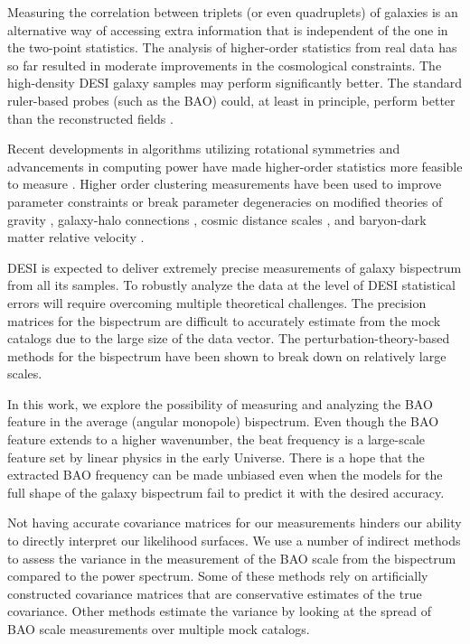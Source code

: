 Measuring the correlation between triplets (or even quadruplets) of galaxies is an alternative way of accessing extra information that is independent of the one in the two-point statistics. The analysis of higher-order statistics from real data has so far resulted in moderate improvements in the cosmological constraints. The high-density DESI galaxy samples may perform significantly better. The standard ruler-based probes (such as the BAO) could, at least in principle, perform better than the reconstructed fields \cite{samushia2021information}.

Recent developments in algorithms utilizing rotational symmetries and advancements in computing power have made higher-order statistics more feasible to measure \citep[see, e.g.,][]{Szapudi_2004,2015MNRAS.454.4142S,2016MNRAS.455L..31S, 2017MNRAS.468.1070S, 2017MNRAS.469.2059S, 2018MNRAS.478.1468S, 2022PNAS..11911366P}. Higher order clustering measurements have been used to improve parameter constraints or break parameter degeneracies on modified theories of gravity \citep{2023arXiv230206808S}, galaxy-halo connections \citep{2022MNRAS.515.6133Z}, cosmic distance scales \citep{2017MNRAS.469.1738S, 2018MNRAS.478.4500P}, and baryon-dark matter relative velocity \citep{2018MNRAS.474.2109S}.

DESI is expected to deliver extremely precise measurements of galaxy bispectrum from all its samples. To robustly analyze the data at the level of DESI statistical errors will require overcoming multiple theoretical challenges. The precision matrices for the bispectrum are difficult to accurately estimate from the mock catalogs due to the large size of the data vector. The perturbation-theory-based methods for the bispectrum have been shown to break down on relatively large scales. 

In this work, we explore the possibility of measuring and analyzing the BAO feature in the average (angular monopole) bispectrum. Even though the BAO feature extends to a higher wavenumber, the beat frequency is a large-scale feature set by linear physics in the early Universe. There is a hope that the extracted BAO frequency can be made unbiased even when the models for the full shape of the galaxy bispectrum fail to predict it with the desired accuracy.

Not having accurate covariance matrices for our measurements hinders our ability to directly interpret our likelihood surfaces. We use a number of indirect methods to assess the variance in the measurement of the BAO scale from the bispectrum compared to the power spectrum. Some of these methods rely on artificially constructed covariance matrices that are conservative estimates of the true covariance. Other methods estimate the variance by looking at the spread of BAO scale measurements over multiple mock catalogs.

